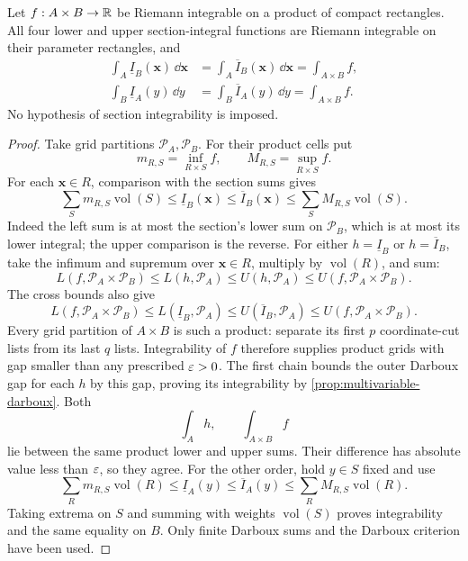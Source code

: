 \begin{theorem}
\label{thm:darboux-fubini}
Let $f:A\times B\to\mathbb{R}$ be Riemann integrable on a product of compact
rectangles. All four lower and upper section-integral functions are
Riemann integrable on their parameter rectangles, and
\[
\begin{aligned}
\int_A\underline I_B(\mathbf{x})\,\dd\mathbf{x}
 &=\int_A\overline I_B(\mathbf{x})\,\dd\mathbf{x}=\int_{A\times B}f,\\
\int_B\underline I_A(y)\,\dd y
 &=\int_B\overline I_A(y)\,\dd y=\int_{A\times B}f.
\end{aligned}
\]
No hypothesis of section integrability is imposed.
\end{theorem}
\begin{proof}
Take grid partitions $\mathcal P_A,\mathcal P_B$. For their product cells put
\[
m_{R,S}=\inf_{R\times S}f,\qquad M_{R,S}=\sup_{R\times S}f.
\]
For each $\mathbf{x}\in R$, comparison with the section sums gives
\[
\sum_Sm_{R,S}\operatorname{vol}(S)
\leq\underline I_B(\mathbf{x})\leq\overline I_B(\mathbf{x})
\leq\sum_SM_{R,S}\operatorname{vol}(S).
\]
Indeed the left sum is at most the section's lower sum on $\mathcal P_B$,
which is at most its lower integral; the upper comparison is the reverse.
For either $h=\underline I_B$ or $h=\overline I_B$, take the infimum and
supremum over $\mathbf{x}\in R$, multiply by $\operatorname{vol}(R)$, and sum:
\[
L(f,\mathcal P_A\times\mathcal P_B)
\leq L(h,\mathcal P_A)\leq U(h,\mathcal P_A)
\leq U(f,\mathcal P_A\times\mathcal P_B).
\]
The cross bounds also give
\[
L(f,\mathcal P_A\times\mathcal P_B)
\leq L(\underline I_B,\mathcal P_A)
\leq U(\overline I_B,\mathcal P_A)
\leq U(f,\mathcal P_A\times\mathcal P_B).
\]
Every grid partition of $A\times B$ is such a product: separate its first
$p$ coordinate-cut lists from its last $q$ lists. Integrability of $f$
therefore supplies product grids with gap smaller than any prescribed
$\varepsilon>0$. The first chain bounds the outer Darboux gap for each $h$ by
this gap, proving its integrability by \cref{prop:multivariable-darboux}.
Both
\[
\int_Ah,\qquad \int_{A\times B}f
\]
 lie between the same product
lower and upper sums. Their difference has absolute value less than
$\varepsilon$, so they agree. For the other order, hold $y\in S$ fixed and use
\[
\sum_Rm_{R,S}\operatorname{vol}(R)
\leq\underline I_A(y)\leq\overline I_A(y)
\leq\sum_RM_{R,S}\operatorname{vol}(R).
\]
Taking extrema on $S$ and summing with weights $\operatorname{vol}(S)$
proves integrability and the same equality on $B$.
Only finite Darboux sums and the Darboux criterion have been used.
\end{proof}

